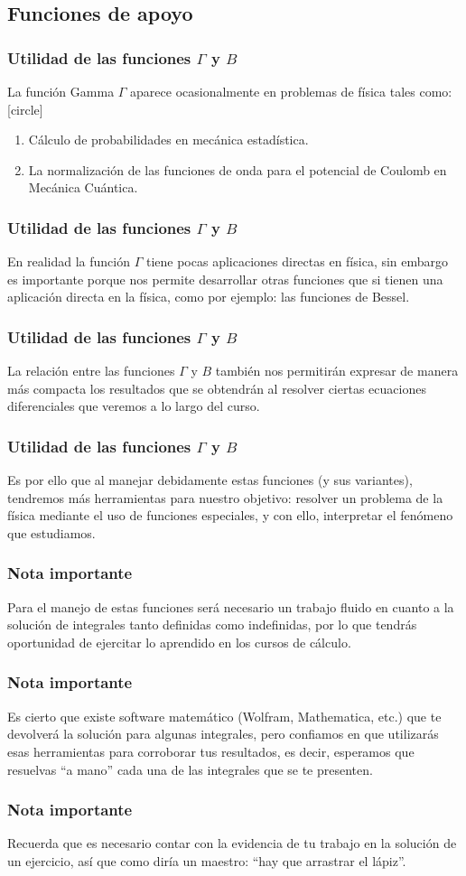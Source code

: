 \subsection{Funciones de apoyo}
\begin{frame}
\frametitle{Utilidad de las funciones $\Gamma$ y $B$}
La función Gamma $\Gamma$ aparece ocasionalmente en problemas de física tales como:
[circle]
\begin{enumerate}[<+->]
\item Cálculo de probabilidades en mecánica estadística.
\item La normalización de las funciones de onda para el potencial de Coulomb en Mecánica Cuántica.
\end{enumerate}
\end{frame}
\begin{frame}
\frametitle{Utilidad de las funciones $\Gamma$ y $B$}
En realidad la función $\Gamma$ tiene pocas aplicaciones directas en física, sin embargo es importante porque nos permite desarrollar otras funciones que si tienen una aplicación directa en la física, como por ejemplo: las funciones de Bessel.
\end{frame}
\begin{frame}
\frametitle{Utilidad de las funciones $\Gamma$ y $B$}
La relación entre las funciones $\Gamma$ y $B$ también nos permitirán expresar de manera más compacta los resultados que se obtendrán al resolver ciertas ecuaciones diferenciales que veremos a lo largo del curso.
\end{frame}
\begin{frame}
\frametitle{Utilidad de las funciones $\Gamma$ y $B$}
Es por ello que al manejar debidamente estas funciones (y sus variantes), tendremos más herramientas para nuestro objetivo: resolver un problema de la física mediante el uso de funciones especiales, y con ello, interpretar el fenómeno que estudiamos.
\end{frame}
\begin{frame}
\frametitle{Nota importante}
Para el manejo de estas funciones será necesario un trabajo fluido en cuanto a la solución de integrales tanto definidas como indefinidas, por lo que tendrás oportunidad de ejercitar lo aprendido en los cursos de cálculo.
\end{frame}
\begin{frame}
\frametitle{Nota importante}
Es cierto que existe software matemático (Wolfram, Mathematica, etc.) que te devolverá la solución para algunas integrales, pero confiamos en que utilizarás esas herramientas para corroborar tus resultados, es decir, esperamos que resuelvas \enquote{a mano} cada una de las integrales que se te presenten.
\end{frame}
\begin{frame}
\frametitle{Nota importante}
Recuerda que es necesario contar con la evidencia de tu trabajo en la solución de un ejercicio, así que como diría un maestro: \enquote{hay que arrastrar el lápiz}.
\end{frame}
